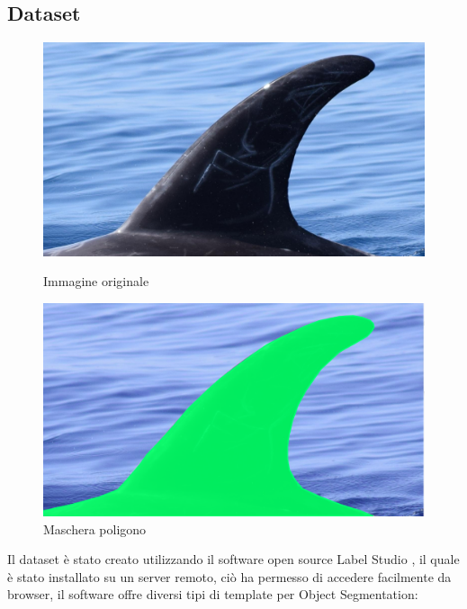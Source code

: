 \documentclass[a4paper,12pt]{report}
\begin{document}
      \subsection{Dataset}
      \begin{figure}[H]
        \centering
        \begin{minipage}{0.4\textwidth}
          \centering
          \includegraphics[width=\textwidth]{assets/images/methods/deep/dataset/original.png}   
          \caption{Immagine originale}
        \end{minipage}
        \begin{minipage}{0.4\textwidth}
          \centering
          \includegraphics[width=\textwidth]{assets/images/methods/deep/dataset/mask.png}   
          \caption{Maschera poligono}
        \end{minipage}
      \end{figure}
      Il dataset è stato creato utilizzando il software open source Label Studio \cite{labelstudio}, il quale è stato installato su un server
      remoto, ciò ha permesso di accedere facilmente da browser, il software offre diversi tipi di 
      template per Object Segmentation:
\end{document}
